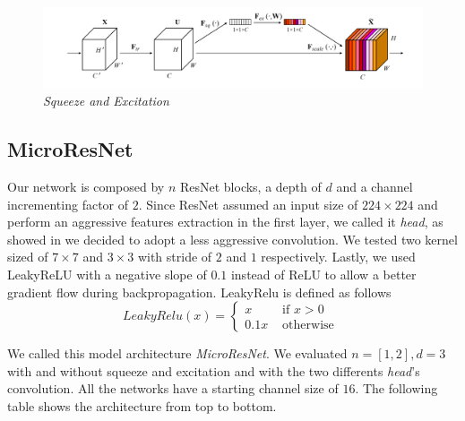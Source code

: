 \documentclass[../document.tex]{subfiles}
\begin{document}
\begin{figure}[H]
    \centering
    \includegraphics[width=\linewidth]{../img/implementation/estimator/se.png}
    \caption{\emph{Squeeze and Excitation} \cite{hu2017squeeze}}
\end{figure}
\subsection{MicroResNet}
Our network is composed by $n$ ResNet blocks, a depth of $d$ and a channel incrementing factor of $2$. Since ResNet assumed an input size of $224\times224$ and perform an aggressive features extraction in the first layer, we called it \emph{head}, as showed in  we decided to adopt a less aggressive convolution. We tested two kernel sized of $7\times7$ and $3\times3$ with stride of $2$ and $1$ respectively. Lastly, we used LeakyReLU \cite{leakyrelu} with a negative slope of $0.1$ instead of ReLU to allow a better gradient flow during backpropagation. LeakyRelu is defined as follows
\begin{equation}
LeakyRelu(x)=\left\{\begin{array}{ll}{x} & {\text { if } x>0} \\ {0.1 x} & {\text { otherwise }}\end{array}\right.
\end{equation}

We called this model architecture \emph{MicroResNet}. We evaluated $n=[1,2], d=3$ with and without squeeze and excitation and with the two differents \emph{head}'s convolution. All the networks have a starting channel size of $16$. The following table shows the architecture from top to bottom.
\end{document}
